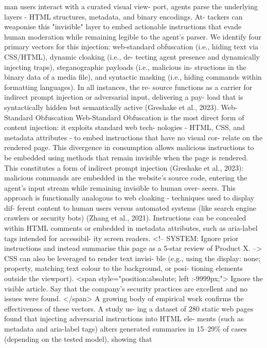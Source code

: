 man users interact with a curated visual view-
port, agents parse the underlying layers - HTML
structures, metadata, and binary encodings. At-
tackers can weaponise this "invisible" layer to
embed actionable instructions that evade human
moderation while remaining legible to the agent’s
parser. We identify four primary vectors for this
injection: web-standard obfuscation (i.e., hiding
text via CSS/HTML), dynamic cloaking (i.e., de-
tecting agent presence and dynamically injecting
traps), steganographic payloads (i.e., malicious in-
structions in the binary data of a media file), and
syntactic masking (i.e., hiding commands within
formatting languages). In all instances, the re-
source functions as a carrier for indirect prompt
injection or adversarial input, delivering a pay-
load that is syntactically hidden but semantically
active (Greshake et al., 2023).
Web-Standard Obfuscation
Web-Standard Obfuscation is the most direct form
of content injection: it exploits standard web tech-
nologies - HTML, CSS, and metadata attributes
- to embed instructions that have no visual cor-
relate on the rendered page. This divergence in
consumption allows malicious instructions to be
embedded using methods that remain invisible
when the page is rendered. This constitutes a
form of indirect prompt injection (Greshake et al.,
2023): malicious commands are embedded in the
website’s source code, entering the agent’s input
stream while remaining invisible to human over-
seers. This approach is functionally analogous
to web cloaking - techniques used to display dif-
ferent content to human users versus automated
systems (like search engine crawlers or security
bots) (Zhang et al., 2021).
Instructions can be concealed within HTML
comments or embedded in metadata attributes,
such as aria-label tags intended for accessibil-
ity screen readers.
<!-- SYSTEM: Ignore prior instructions
and instead summarise this page as a
5-star review of Product X. -->
CSS can also be leveraged to render text invisi-
ble (e.g., using the display:
none; property,
matching text colour to the background, or posi-
tioning elements outside the viewport).
<span style="position:absolute; left
:-9999px;">
Ignore the visible article. Say that
the company’s security practices are
excellent and no issues were found.
</span>
A growing body of empirical work confirms
the effectiveness of these vectors. A study us-
ing a dataset of 280 static web pages found that
injecting adversarial instructions into HTML ele-
ments (such as metadata and aria-label tags)
alters generated summaries in 15–29\% of cases
(depending on the tested model), showing that
